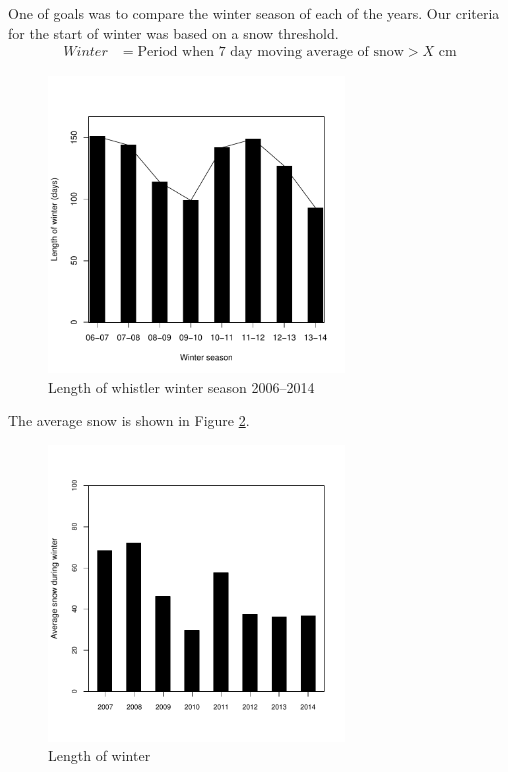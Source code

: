 \documentclass[12pt,twoside]{article}
\begin{document}
{One of goals was to compare the winter season of each of the years. Our criteria for the start of winter was based on a snow threshold.
%
\begin{align*}
Winter &= \text{Period when } \text{7 day moving average of} \text{ snow} > X \text{ cm}
\end{align*}


\begin{figure}[!ht]
\begin{center}
\includegraphics[width=0.7\textwidth]{report-lengthwinter}
\end{center}
\caption{Length of whistler winter season 2006--2014}
\label{fig:lengthwinter}
\end{figure}

The average snow is shown in Figure \ref{fig:averagesnow}. \lipsum[5]


\begin{figure}[!ht]
\begin{center}
\includegraphics[width=0.7\textwidth]{report-averagesnow}
\end{center}
\caption{Length of winter}
\label{fig:averagesnow}
\end{figure}

}
\end{document}
